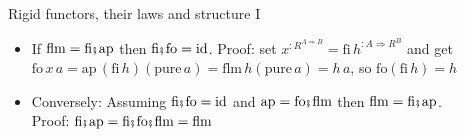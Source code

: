 \documentclass[english]{beamer}
\newcommand{\bef}{\hspace{0.5pt}\ensuremath\mathsmaller{\fatsemi}\hspace{1.5pt}}
\begin{document}
\begin{frame}{Rigid functors, their laws and structure I}
\begin{itemize}
\begin{itemize}
\item {\small{}$\text{ap}:R^{A\Rightarrow B}\Rightarrow R^{A}\Rightarrow R^{B}$}{\small\par}
\item The connection is {\small{}$\text{flm}=\text{fi}\bef\text{ap}$} and
{\small{}$\text{ap}=\text{fo}\bef\text{flm}$}{\small\par}
\begin{itemize}
\item However, here we need to flip the order of $R$-effects in \texttt{\textcolor{blue}{\footnotesize{}ap}} 
\end{itemize}
\item Connection between $\text{ap}$ and $\text{fo}$ is $\text{fo}\,x\,a=\text{ap}\,x\,\left(\text{pure}\,a\right)$
\end{itemize}
\item If {\small{}$\text{flm}=\text{fi}\bef\text{ap}$} then $\text{fi}\bef\text{fo}=\text{id}$.
Proof: set $x^{:R^{A\Rightarrow B}}=\text{fi}\,h^{:A\Rightarrow R^{B}}$
and get $\text{fo}\,x\,a=\text{ap}\,\left(\text{fi}\,h\right)\left(\text{pure}\,a\right)=\text{flm}\,h\left(\text{pure}\,a\right)=h\,a$,
so $\text{fo}\left(\text{fi}\,h\right)=h$ 
\item Conversely: Assuming $\text{fi}\bef\text{fo}=\text{id}$ and {\small{}$\text{ap}=\text{fo}\bef\text{flm}$}
then {\small{}$\text{flm}=\text{fi}\bef\text{ap}$.}\\
{\small{} Proof: $\text{fi}\bef\text{ap}=\text{fi}\bef\text{fo}\bef\text{flm}=\text{flm}$} 
\end{itemize}
\end{frame}
\end{document}
